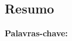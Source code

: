 \thispagestyle{empty}
\begin{spacing}{1.0}
\chapter*{Resumo}

\textbf{Palavras-chave:} 
        
\clearpage
\end{spacing}